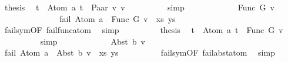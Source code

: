 \begin{isabellebody}
\ {\isacharquery}{\kern0pt}thesis\ \isamarkupfalse%
\ {\isacartoucheopen}t{}\ {\isacharequal}{\kern0pt}\ Atom\ a{\isacartoucheclose}\ {\isacartoucheopen}t{}\ {\isacharequal}{\kern0pt}\ Paar\ v{}\ v{}{\isacartoucheclose}\isanewline
\ \ \ \ \ \ \ \ \isamarkupfalse%
\ simp\isanewline
\ \ \ \ \isamarkupfalse%
\isanewline
\ \ \ \ \ \ \isamarkupfalse%
\ {\isacharparenleft}{\kern0pt}Func\ G\ v{\isacharparenright}{\kern0pt}\isanewline
\ \ \ \ \ \ %
\isanewline
\ \ \ \ \ \ \isamarkupfalse%
\ {\isachardoublequoteopen}fail\ {\isacharparenleft}{\kern0pt}{\isacharparenleft}{\kern0pt}Atom\ a\ {\isasymapprox}{\isacharquery}{\kern0pt}\ Func\ G\ v{\isacharparenright}{\kern0pt}\ {\isacharhash}{\kern0pt}\ xs{\isacharcomma}{\kern0pt}\ ys{\isacharparenright}{\kern0pt}{\isachardoublequoteclose}\isanewline
\ \ \ \ \ \ \ \ \isamarkupfalse%
\ fail{\isacharunderscore}{\kern0pt}sym{\isacharbrackleft}{\kern0pt}OF\ fail{\isacharunderscore}{\kern0pt}func{\isacharunderscore}{\kern0pt}atom{\isacharbrackright}{\kern0pt}\ \isamarkupfalse%
\ simp\isanewline
\ \ \ \ \ \ \isamarkupfalse%
\ \isamarkupfalse%
\ {\isacharquery}{\kern0pt}thesis\ \isamarkupfalse%
\ {\isacartoucheopen}t{}\ {\isacharequal}{\kern0pt}\ Atom\ a{\isacartoucheclose}\ {\isacartoucheopen}t{}\ {\isacharequal}{\kern0pt}\ Func\ G\ v{\isacartoucheclose}\isanewline
\ \ \ \ \ \ \ \ \isamarkupfalse%
\ simp\isanewline
\ \ \ \ \isamarkupfalse%
\isanewline
\ \ \ \ \ \ \isamarkupfalse%
\ {\isacharparenleft}{\kern0pt}Abst\ b\ v{\isacharparenright}{\kern0pt}\isanewline
\ \ \ \ \ \ %
\isanewline
\ \ \ \ \ \ \isamarkupfalse%
\ {\isachardoublequoteopen}fail\ {\isacharparenleft}{\kern0pt}{\isacharparenleft}{\kern0pt}Atom\ a\ {\isasymapprox}{\isacharquery}{\kern0pt}\ Abst\ b\ v{\isacharparenright}{\kern0pt}\ {\isacharhash}{\kern0pt}\ xs{\isacharcomma}{\kern0pt}\ ys{\isacharparenright}{\kern0pt}{\isachardoublequoteclose}\isanewline
\ \ \ \ \ \ \ \ \isamarkupfalse%
\ fail{\isacharunderscore}{\kern0pt}sym{\isacharbrackleft}{\kern0pt}OF\ fail{\isacharunderscore}{\kern0pt}abst{\isacharunderscore}{\kern0pt}atom{\isacharbrackright}{\kern0pt}\ \isamarkupfalse%
\ simp\isanewline

\end{isabellebody}

